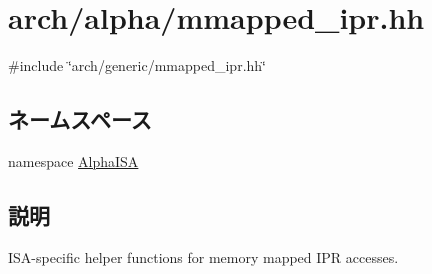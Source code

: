 \hypertarget{alpha_2mmapped__ipr_8hh}{
\section{arch/alpha/mmapped\_\-ipr.hh}
\label{alpha_2mmapped__ipr_8hh}
}
{\ttfamily \#include \char`\"{}arch/generic/mmapped\_\-ipr.hh\char`\"{}}\par
\subsection*{ネームスペース}
\begin{DoxyCompactItemize}
\item 
namespace \hyperlink{namespaceAlphaISA}{AlphaISA}
\end{DoxyCompactItemize}


\subsection{説明}
ISA-\/specific helper functions for memory mapped IPR accesses. 